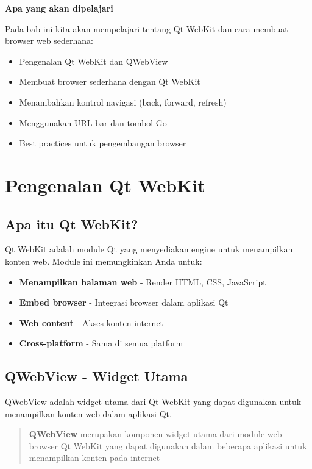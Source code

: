 \textbf{Apa yang akan dipelajari}

Pada bab ini kita akan mempelajari tentang Qt WebKit dan cara membuat browser web sederhana:

\begin{itemize}
\item Pengenalan Qt WebKit dan QWebView
\item Membuat browser sederhana dengan Qt WebKit
\item Menambahkan kontrol navigasi (back, forward, refresh)
\item Menggunakan URL bar dan tombol Go
\item Best practices untuk pengembangan browser
\end{itemize}

\minitoc

\section{Pengenalan Qt WebKit}

\subsection{Apa itu Qt WebKit?}

Qt WebKit adalah module Qt yang menyediakan engine untuk menampilkan konten web. Module ini memungkinkan Anda untuk:

\begin{itemize}
\item \textbf{Menampilkan halaman web} - Render HTML, CSS, JavaScript
\item \textbf{Embed browser} - Integrasi browser dalam aplikasi Qt
\item \textbf{Web content} - Akses konten internet
\item \textbf{Cross-platform} - Sama di semua platform
\end{itemize}

\subsection{QWebView - Widget Utama}

QWebView adalah widget utama dari Qt WebKit yang dapat digunakan untuk menampilkan konten web dalam aplikasi Qt.

\begin{quote}
\textbf{QWebView} merupakan komponen widget utama dari module web browser Qt WebKit yang dapat digunakan dalam beberapa aplikasi untuk menampilkan konten pada internet
\end{quote}

